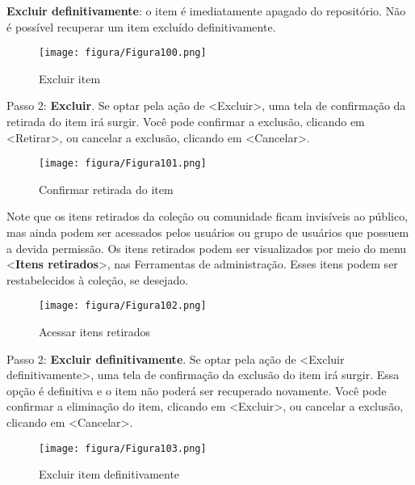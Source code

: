 \documentclass[12pt,hidelinks]{article}
\begin{document}
     \singlespacing
     
    \textbf{Excluir definitivamente}: o item é imediatamente apagado do repositório. Não é possível  recuperar um item excluído definitivamente.
    
    \begin{figure}[!htp]
                \centering
                \texttt{[image: figura/Figura100.png]}
                \caption{Excluir item}
            \label{Rotulo}
        \end{figure}

\newpage

    Passo 2: \textbf{Excluir}. Se optar pela ação de <Excluir>, uma tela de confirmação da retirada do item irá surgir. Você pode confirmar a exclusão, clicando em <Retirar>, ou cancelar a exclusão, clicando em <Cancelar>.
    
    \begin{figure}[!htp]
                \centering
                \texttt{[image: figura/Figura101.png]}
                \caption{Confirmar retirada do item}
            \label{Rotulo}
        \end{figure}
    
    Note que os itens retirados da coleção ou comunidade ficam invisíveis ao público, mas ainda podem ser acessados pelos usuários ou grupo de usuários que possuem a devida permissão. Os itens retirados podem ser visualizados por meio do menu <\textbf{Itens retirados}>, nas Ferramentas de administração. Esses itens podem ser restabelecidos à coleção, se desejado.

\newpage

    \begin{figure}[!htp]
                \centering
                \texttt{[image: figura/Figura102.png]}
                \caption{Acessar itens retirados}
            \label{Rotulo}
        \end{figure}
    
    Passo 2: \textbf{Excluir definitivamente}. Se optar pela ação de <Excluir definitivamente>, uma tela de confirmação da exclusão do item irá surgir. Essa opção é definitiva e o item não poderá ser recuperado novamente. Você pode confirmar a eliminação do item, clicando em <Excluir>, ou cancelar a exclusão, clicando em <Cancelar>.
    
    \begin{figure}[!htp]
                \centering
                \texttt{[image: figura/Figura103.png]}
                \caption{Excluir item definitivamente}
            \label{Rotulo}
        \end{figure}
\end{document}
